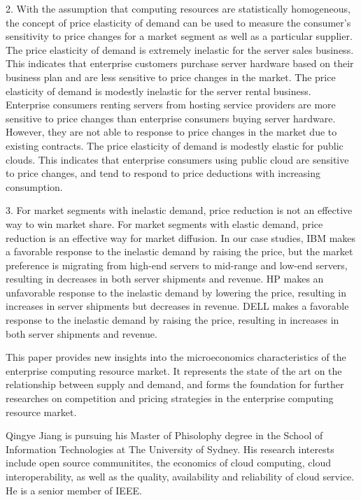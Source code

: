 \documentclass[10pt,journal,cspaper,compsoc]{IEEEtran}
\begin{document}
2. With the assumption that computing resources are statistically homogeneous, the concept of price elasticity of demand can be used to measure the consumer's sensitivity to price changes for a market segment as well as a particular supplier. The price elasticity of demand is extremely inelastic for the server sales business. This indicates that enterprise customers purchase server hardware based on their business plan and are less sensitive to price changes in the market. The price elasticity of demand is modestly inelastic for the server rental business. Enterprise consumers renting servers from hosting service providers are more sensitive to price changes than enterprise consumers buying server hardware. However, they are not able to response to price changes in the market due to existing contracts. The price elasticity of demand is modestly elastic for public clouds. This indicates that enterprise consumers using public cloud are sensitive to price changes, and tend to respond to price deductions with increasing consumption.

3. For market segments with inelastic demand, price reduction is not an effective way to win market share. For market segments with elastic demand, price reduction is an effective way for market diffusion. In our case studies, IBM makes a favorable response to the inelastic demand by raising the price, but the market preference is migrating from high-end servers to mid-range and low-end servers, resulting in decreases in both server shipments and revenue. HP makes an unfavorable response to the inelastic demand by lowering the price, resulting in increases in server shipments but decreases in revenue. DELL makes a favorable response to the inelastic demand by raising the price, resulting in increases in both server shipments and revenue.

This paper provides new insights into the microeconomics characteristics of the enterprise computing resource market. It represents the state of the art on the relationship between supply and demand, and forms the foundation for further researches on competition and pricing strategies in the enterprise computing resource market. 

  


\begin{IEEEbiographynophoto}{Qingye Jiang}
is pursuing his Master of Phisolophy degree in the School of Information Technologies at The University of Sydney. His research interests include open source communitites, the economics of cloud computing, cloud interoperability, as well as the quality, availability and reliability of cloud service. He is a senior member of IEEE.
\end{IEEEbiographynophoto}
\end{document}
